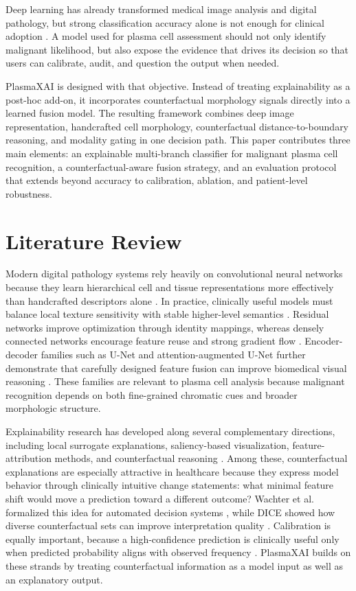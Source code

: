 \documentclass[runningheads]{llncs}
\begin{document}
Deep learning has already transformed medical image analysis and digital pathology, but strong classification accuracy alone is not enough for clinical adoption \cite{litjens,bera,campanella}. A model used for plasma cell assessment should not only identify malignant likelihood, but also expose the evidence that drives its decision so that users can calibrate, audit, and question the output when needed.

PlasmaXAI is designed with that objective. Instead of treating explainability as a post-hoc add-on, it incorporates counterfactual morphology signals directly into a learned fusion model. The resulting framework combines deep image representation, handcrafted cell morphology, counterfactual distance-to-boundary reasoning, and modality gating in one decision path. This paper contributes three main elements: an explainable multi-branch classifier for malignant plasma cell recognition, a counterfactual-aware fusion strategy, and an evaluation protocol that extends beyond accuracy to calibration, ablation, and patient-level robustness.

\section{Literature Review}
Modern digital pathology systems rely heavily on convolutional neural networks because they learn hierarchical cell and tissue representations more effectively than handcrafted descriptors alone \cite{litjens,janowczyk}. In practice, clinically useful models must balance local texture sensitivity with stable higher-level semantics \cite{bera,campanella}. Residual networks improve optimization through identity mappings, whereas densely connected networks encourage feature reuse and strong gradient flow \cite{resnet,densenet}. Encoder-decoder families such as U-Net and attention-augmented U-Net further demonstrate that carefully designed feature fusion can improve biomedical visual reasoning \cite{unet,attentionunet}. These families are relevant to plasma cell analysis because malignant recognition depends on both fine-grained chromatic cues and broader morphologic structure.

Explainability research has developed along several complementary directions, including local surrogate explanations, saliency-based visualization, feature-attribution methods, and counterfactual reasoning \cite{lime,gradcam,shap,wachter}. Among these, counterfactual explanations are especially attractive in healthcare because they express model behavior through clinically intuitive change statements: what minimal feature shift would move a prediction toward a different outcome? Wachter et al. formalized this idea for automated decision systems \cite{wachter}, while DICE showed how diverse counterfactual sets can improve interpretation quality \cite{diceml}. Calibration is equally important, because a high-confidence prediction is clinically useful only when predicted probability aligns with observed frequency \cite{calibration}. PlasmaXAI builds on these strands by treating counterfactual information as a model input as well as an explanatory output.
\end{document}
